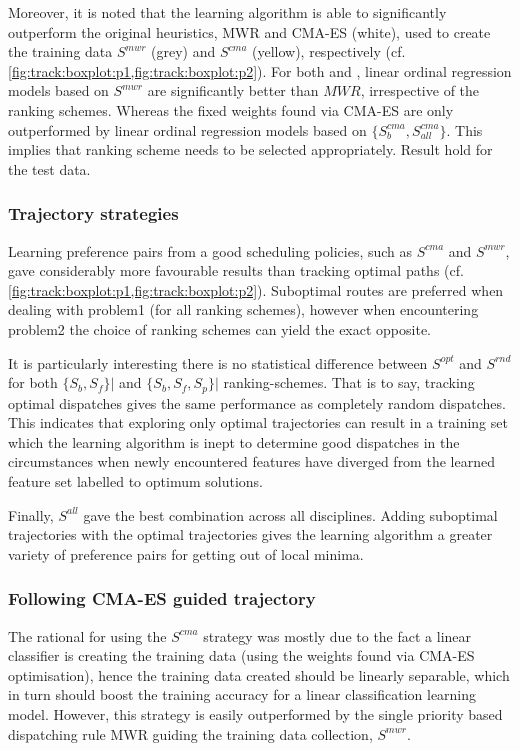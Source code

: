 Moreover, it is noted that the learning algorithm is able to significantly outperform the original heuristics, MWR and CMA-ES (white), used to create the training data $S^{mwr}$ (grey) and $S^{cma}$ (yellow), respectively (cf. \cref{fig:track:boxplot:p1,fig:track:boxplot:p2}). For both  and , linear ordinal regression models based on $S^{mwr}$ are significantly better than $MWR$, irrespective of the ranking schemes. Whereas the fixed weights found via CMA-ES are only outperformed by linear ordinal regression models based on $\{S_b^{cma},S_{all}^{cma}\}$. This implies that ranking scheme needs to be selected appropriately. Result hold for the test data.

\subsubsection{Trajectory strategies}
Learning preference pairs from a good scheduling policies, such as $S^{cma}$ and $S^{mwr}$, gave considerably more favourable results than tracking optimal paths (cf. \cref{fig:track:boxplot:p1,fig:track:boxplot:p2}). Suboptimal routes are preferred when dealing with problem{1} (for all ranking schemes), however when encountering problem{2} the choice of ranking schemes can yield the exact opposite.

It is particularly interesting there is no statistical difference between $S^{opt}$ and $S^{rnd}$ for both $\{S_{b},S_{f}\}\big|$ and $\{S_b,S_f,S_p\}\big|$ ranking-schemes. That is to say, tracking optimal dispatches gives the same performance as completely random dispatches. This indicates that exploring only optimal trajectories can result in a training set which the learning algorithm is inept to determine good dispatches in the circumstances when newly encountered features have diverged from the learned feature set labelled to optimum solutions. 

Finally, $S^{all}$ gave the best combination across all disciplines. Adding suboptimal trajectories with the optimal trajectories gives the learning algorithm a greater variety of preference pairs for getting out of local minima.

\subsubsection{Following CMA-ES guided trajectory}
The rational for using the $S^{cma}$ strategy was mostly due to the fact a linear classifier is creating the training data (using the weights found via CMA-ES optimisation), hence the training data created should be linearly separable, which in turn should boost the training accuracy for a linear classification learning model. However, this strategy is easily outperformed by the single priority based dispatching rule MWR guiding the training data collection, $S^{mwr}$. 

